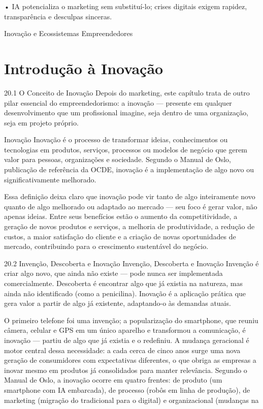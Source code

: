 • IA potencializa o marketing sem substituí-lo; crises digitais exigem rapidez, transparência e desculpas sinceras.

Inovação e Ecossistemas Empreendedores

\chapter{Introdução à Inovação}

20.1 O Conceito de Inovação Depois do marketing, este capítulo trata de outro pilar essencial do empreendedorismo: a inovação — presente em qualquer desenvolvimento que um profissional imagine, seja dentro de uma organização, seja em projeto próprio.

Inovação Inovação é o processo de transformar ideias, conhecimentos ou tecnologias em produtos, serviços, processos ou modelos de negócio que gerem valor para pessoas, organizações e sociedade. Segundo o Manual de Oslo, publicação de referência da OCDE, inovação é a implementação de algo novo ou significativamente melhorado.

Essa definição deixa claro que inovação pode vir tanto de algo inteiramente novo quanto de algo melhorado ou adaptado ao mercado — seu foco é gerar valor, não apenas ideias. Entre seus benefícios estão o aumento da competitividade, a geração de novos produtos e serviços, a melhoria de produtividade, a redução de custos, a maior satisfação do cliente e a criação de novas oportunidades de mercado, contribuindo para o crescimento sustentável do negócio.

20.2 Invenção, Descoberta e Inovação Invenção, Descoberta e Inovação Invenção é criar algo novo, que ainda não existe — pode nunca ser implementada comercialmente. Descoberta é encontrar algo que já existia na natureza, mas ainda não identificado (como a penicilina). Inovação é a aplicação prática que gera valor a partir de algo já existente, adaptando-o às demandas atuais.

O primeiro telefone foi uma invenção; a popularização do smartphone, que reuniu câmera, celular e GPS em um único aparelho e transformou a comunicação, é inovação — partiu de algo que já existia e o redefiniu. A mudança geracional é motor central dessa necessidade: a cada cerca de cinco anos surge uma nova geração de consumidores com expectativas diferentes, o que obriga as empresas a inovar mesmo em produtos já consolidados para manter relevância. Segundo o Manual de Oslo, a inovação ocorre em quatro frentes: de produto (um smartphone com IA embarcada), de processo (robôs em linha de produção), de marketing (migração do tradicional para o digital) e organizacional (mudanças na

